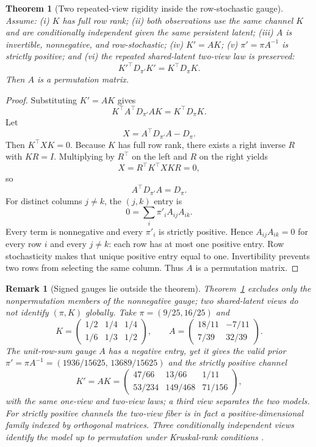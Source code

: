 \documentclass[11pt]{article}
\newtheorem{theorem}{Theorem}
\newtheorem{remark}{Remark}
\begin{document}
\begin{theorem}[Two repeated-view rigidity inside the row-stochastic gauge]\label{thm:twoview}
Assume: (i) $K$ has full row rank; (ii) both observations use the same channel $K$ and are conditionally independent given the same persistent latent; (iii) $A$ is invertible, nonnegative, and row-stochastic; (iv) $K'=AK$; (v) $\pi'=\pi A^{-1}$ is strictly positive; and (vi) the repeated shared-latent two-view law is preserved:
\[
K'^\top D_{\pi'}K'=K^\top D_\pi K.
\]
Then $A$ is a permutation matrix.
\end{theorem}

\begin{proof}
Substituting $K'=AK$ gives
\[
K^\top A^\top D_{\pi'}AK=K^\top D_\pi K.
\]
Let
\[
X=A^\top D_{\pi'}A-D_\pi.
\]
Then $K^\top XK=0$. Because $K$ has full row rank, there exists a right inverse $R$ with $KR=I$. Multiplying by $R^\top$ on the left and $R$ on the right yields
\[
X=R^\top K^\top XKR=0,
\]
so
\[
A^\top D_{\pi'}A=D_\pi.
\]
For distinct columns $j\ne k$, the $(j,k)$ entry is
\[
0=\sum_i\pi'_iA_{ij}A_{ik}.
\]
Every term is nonnegative and every $\pi'_i$ is strictly positive. Hence $A_{ij}A_{ik}=0$ for every row $i$ and every $j\ne k$: each row has at most one positive entry. Row stochasticity makes that unique positive entry equal to one. Invertibility prevents two rows from selecting the same column. Thus $A$ is a permutation matrix.
\end{proof}

\begin{remark}[Signed gauges lie outside the theorem]\label{rem:signed}
Theorem~\ref{thm:twoview} excludes only the nonpermutation members of the nonnegative gauge; two shared-latent views do not identify $(\pi,K)$ globally. Take $\pi=(9/25,16/25)$ and
\[
K=\begin{pmatrix}1/2&1/4&1/4\\1/6&1/3&1/2\end{pmatrix},\qquad
A=\begin{pmatrix}18/11&-7/11\\7/39&32/39\end{pmatrix}.
\]
The unit-row-sum gauge $A$ has a negative entry, yet it gives the valid prior $\pi'=\pi A^{-1}=(1936/15625,\,13689/15625)$ and the strictly positive channel
\[
K'=AK=\begin{pmatrix}47/66&13/66&1/11\\53/234&149/468&71/156\end{pmatrix},
\]
with the same one-view and two-view laws; a third view separates the two models. For strictly positive channels the two-view fiber is in fact a positive-dimensional family indexed by orthogonal matrices. Three conditionally independent views identify the model up to permutation under Kruskal-rank conditions \citep{kruskal1977,allman2009}.
\end{remark}
\end{document}
